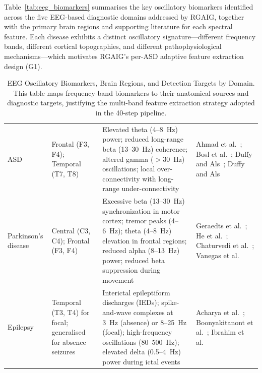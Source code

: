 \noindent Table~\ref{tab:eeg_biomarkers} summarises the key oscillatory biomarkers identified across the five EEG-based diagnostic domains addressed by RGAIG, together with the primary brain regions and supporting literature for each spectral feature. Each disease exhibits a distinct oscillatory signature---different frequency bands, different cortical topographies, and different pathophysiological mechanisms---which motivates RGAIG's per-ASD adaptive feature extraction design (G1).

\iffalse %

\begin{table}[H]
\tablestripes\tablefontsize
\caption[EEG Oscillatory Biomarkers, Brain Regions, and Detection]{EEG Oscillatory Biomarkers, Brain Regions, and Detection Targets by Domain. This table maps frequency-band biomarkers to their anatomical sources and diagnostic targets, justifying the multi-band feature extraction strategy adopted in the 40-step pipeline.}
\tablefontsize
\begin{tabularx}{\textwidth}{@{} >{\raggedright\arraybackslash}p{2.0cm} >{\raggedright\arraybackslash}p{2.0cm} L L @{}}
\toprule
{} &  &  &  \\
\midrule
ASD & Frontal (F3, F4); Temporal (T7, T8) & Elevated theta (4--8~Hz) power; reduced long-range beta (13--30~Hz) coherence; altered gamma ($>$30~Hz) oscillations; local over-connectivity with long-range under-connectivity & Ahmad et al.~\cite{ahmad2020eeg}; Bosl et al.~\cite{bosl2018eeg}; Duffy and Als~\cite{duffy2019eeg}; Duffy and Als~\cite{duffy2012coherence} \\
\addlinespace
Parkinson's disease & Central (C3, C4); Frontal (F3, F4) & Excessive beta (13--30~Hz) synchronization in motor cortex; tremor peaks (4--6~Hz); theta (4--8~Hz) elevation in frontal regions; reduced alpha (8--13~Hz) power; reduced beta suppression during movement & Geraedts et al.~\cite{geraedts2018eeg}; He et al.~\cite{he2021identification}; Chaturvedi et al.~\cite{chaturvedi2017pd}; Vanegas et al.~\cite{vanegas2018pd} \\
\addlinespace
Epilepsy & Temporal (T3, T4) for focal; generalised for absence seizures & Interictal epileptiform discharges (IEDs); spike-and-wave complexes at 3~Hz (absence) or 8--25~Hz (focal); high-frequency oscillations (80--500~Hz); elevated delta (0.5--4~Hz) power during ictal events & Acharya et al.~\cite{acharya2018epilepsy}; Boonyakitanont et al.~\cite{boonyakitanont2020review}; Ibrahim et al.~\cite{ibrahim2018epilepsy} \\

\end{tabularx}
\end{table}
